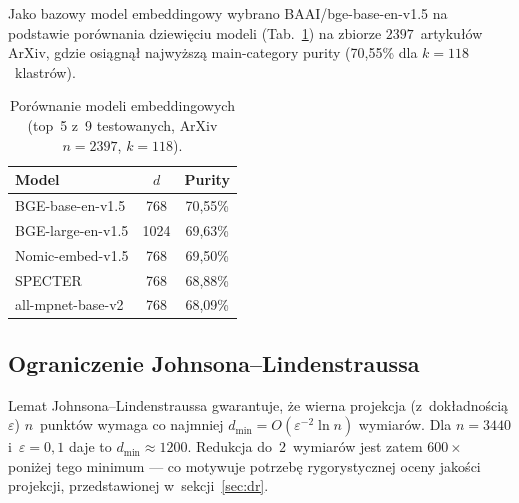 \documentclass[a4paper,11pt,twocolumn]{article}
\begin{document}

Jako bazowy model embeddingowy wybrano BAAI/bge-base-en-v1.5 na podstawie
porównania dziewięciu modeli (Tab.~\ref{tab:models}) na zbiorze
$2397$~artykułów ArXiv, gdzie osiągnął najwyższą main-category purity
(70,55\% dla $k=118$~klastrów).

\begin{table}[t]
\centering
\caption{Porównanie modeli embeddingowych (top~5 z~9 testowanych,
ArXiv $n=2397$, $k=118$).}
\label{tab:models}
\small
\begin{tabular}{@{}lcc@{}}
\toprule
Model & $d$ & Purity \\
\midrule
BGE-base-en-v1.5    & 768  & 70,55\% \\
BGE-large-en-v1.5   & 1024 & 69,63\% \\
Nomic-embed-v1.5    & 768  & 69,50\% \\
SPECTER             & 768  & 68,88\% \\
all-mpnet-base-v2   & 768  & 68,09\% \\
\bottomrule
\end{tabular}
\end{table}

\subsection{Ograniczenie Johnsona--Lindenstraussa}

Lemat Johnsona--Lindenstraussa gwarantuje, że wierna projekcja
(z~dokładnością $\varepsilon$) $n$~punktów wymaga co najmniej
$d_{\min} = O(\varepsilon^{-2} \ln n)$ wymiarów. Dla $n=3440$
i~$\varepsilon=0{,}1$ daje to $d_{\min} \approx 1200$. Redukcja
do~$2$~wymiarów jest zatem $600\times$ poniżej tego minimum ---
co motywuje potrzebę rygorystycznej oceny jakości projekcji,
przedstawionej w~sekcji~\ref{sec:dr}.


\end{document}
